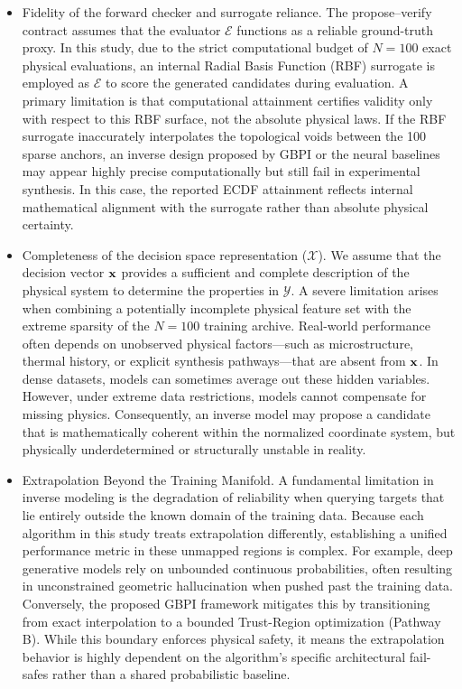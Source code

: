 \begin{itemize}
  \item Fidelity of the forward checker and surrogate reliance.
  The propose--verify contract assumes that the evaluator $\mathcal{E}$ functions as a reliable ground-truth proxy. In this study, due to the strict computational budget of $N=100$ exact physical evaluations, an internal Radial Basis Function (RBF) surrogate is employed as $\mathcal{E}$ to score the generated candidates during evaluation. A primary limitation is that computational attainment certifies validity only with respect to this RBF surface, not the absolute physical laws. If the RBF surrogate inaccurately interpolates the topological voids between the 100 sparse anchors, an inverse design proposed by GBPI or the neural baselines may appear highly precise computationally but still fail in experimental synthesis. In this case, the reported ECDF attainment reflects internal mathematical alignment with the surrogate rather than absolute physical certainty.

  \item Completeness of the decision space representation ($\mathcal{X}$).
  We assume that the decision vector $\mathbf{x}$ provides a sufficient and complete description of the physical system to determine the properties in $\mathcal{Y}$. A severe limitation arises when combining a potentially incomplete physical feature set with the extreme sparsity of the $N=100$ training archive. Real-world performance often depends on unobserved physical factors—such as microstructure, thermal history, or explicit synthesis pathways—that are absent from $\mathbf{x}$. In dense datasets, models can sometimes average out these hidden variables. However, under extreme data restrictions, models cannot compensate for missing physics. Consequently, an inverse model may propose a candidate that is mathematically coherent within the normalized coordinate system, but physically underdetermined or structurally unstable in reality.

  \item Extrapolation Beyond the Training Manifold.
  A fundamental limitation in inverse modeling is the degradation of reliability when querying targets that lie entirely outside the known domain of the training data. Because each algorithm in this study treats extrapolation differently, establishing a unified performance metric in these unmapped regions is complex. For example, deep generative models rely on unbounded continuous probabilities, often resulting in unconstrained geometric hallucination when pushed past the training data. Conversely, the proposed GBPI framework mitigates this by transitioning from exact interpolation to a bounded Trust-Region optimization (Pathway B). While this boundary enforces physical safety, it means the extrapolation behavior is highly dependent on the algorithm's specific architectural fail-safes rather than a shared probabilistic baseline.


\end{itemize}
